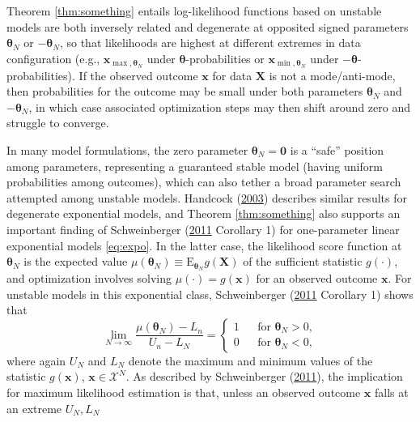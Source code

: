 \documentclass[]{article}
\theoremstyle{definition}
\begin{document}
Theorem \ref{thm:something} entails log-likelihood functions based on
unstable models are both inversely related and degenerate at opposited
signed parameters \(\boldsymbol \theta_N\) or \(-\boldsymbol \theta_N\),
so that likelihoods are highest at different extremes in data
configuration (e.g., \(\boldsymbol{x}_{\max, \boldsymbol \theta_N}\)
under \(\boldsymbol \theta\)-probabilities or
\(\boldsymbol{x}_{\min, \boldsymbol \theta_N}\) under
\(-\boldsymbol \theta\)-probabilities). If the observed outcome
\(\boldsymbol x\) for data \(\boldsymbol X\) is not a mode/anti-mode,
then probabilities for the outcome may be small under both parameters
\(\boldsymbol \theta_N\) and \(-\boldsymbol \theta_N\), in which case
associated optimization steps may then shift around zero and struggle to
converge.

In many model formulations, the zero parameter
\(\boldsymbol \theta_N=\boldsymbol 0\) is a ``safe'' position among
parameters, representing a guaranteed stable model (having uniform
probabilities among outcomes), which can also tether a broad parameter
search attempted among unstable models. Handcock
(\protect\hyperlink{ref-handcock2003assessing}{2003}) describes similar
results for degenerate exponential models, and Theorem
\ref{thm:something} also supports an important finding of Schweinberger
(\protect\hyperlink{ref-schweinberger2011instability}{2011} Corollary 1)
for one-parameter linear exponential models \eqref{eq:expo}. In the latter
case, the likelihood score function at \(\boldsymbol \theta_N\) is the
expected value
\(\mu(\boldsymbol \theta_N)\equiv \mathrm{E}_{\boldsymbol \theta_N} g(\boldsymbol X)\)
of the sufficient statistic \(g(\cdot)\), and optimization involves
solving \(\mu(\cdot)=g(\boldsymbol x)\) for an observed outcome
\(\boldsymbol x\). For unstable models in this exponential class,
Schweinberger
(\protect\hyperlink{ref-schweinberger2011instability}{2011} Corollary 1)
shows that \[
\lim_{N\to \infty}\frac{\mu(\boldsymbol \theta_N) -L_n}{U_n-L_N}= \left\{ \begin{array}{lcl}
1 && \text{for } \boldsymbol \theta_N>0,\\
0 && \text{for } \boldsymbol \theta_N<0, \end{array}\right.
\] where again \(U_N\) and \(L_N\) denote the maximum and minimum values
of the statistic \(g(\boldsymbol x)\),
\(\boldsymbol x\in\mathcal{X}^N\). As described by Schweinberger
(\protect\hyperlink{ref-schweinberger2011instability}{2011}), the
implication for maximum likelihood estimation is that, unless an
observed outcome \(\boldsymbol x\) falls at an extreme \(U_N, L_N\)
\end{document}
